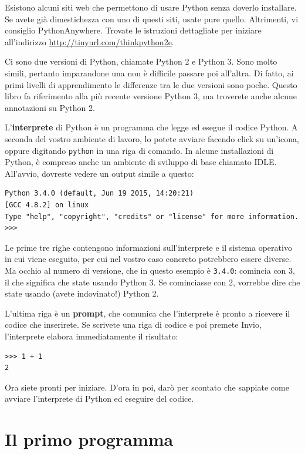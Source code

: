 \documentclass[10pt]{book}
\begin{document}
Esistono alcuni siti web che permettono di usare Python senza doverlo installare. Se avete già dimestichezza con uno di questi siti, usate pure quello. Altrimenti, vi consiglio PythonAnywhere. Trovate le istruzioni dettagliate per iniziare all'indirizzo \url{http://tinyurl.com/thinkpython2e}.

Ci sono due versioni di Python, chiamate Python 2 e Python 3. Sono molto simili, pertanto imparandone una non è difficile passare poi all'altra. Di fatto, ai primi livelli di apprendimento le differenze tra le due versioni sono poche. 
Questo libro fa riferimento alla più recente versione Python 3, ma troverete anche alcune annotazioni su Python 2.

L'{\bf interprete} di Python è un programma che legge ed esegue il codice Python. A seconda del vostro ambiente di lavoro, lo potete avviare facendo click su un'icona, oppure digitando {\tt python} in una riga di comando. In alcune installazioni di Python, è compreso anche un ambiente di sviluppo di base chiamato IDLE.
All'avvio, dovreste vedere un output simile a questo:

\begin{verbatim}
Python 3.4.0 (default, Jun 19 2015, 14:20:21)
[GCC 4.8.2] on linux
Type "help", "copyright", "credits" or "license" for more information.
>>>
\end{verbatim}
%
Le prime tre righe contengono informazioni sull'interprete e il sistema operativo in cui viene eseguito, per cui nel vostro caso concreto potrebbero essere diverse. Ma occhio al numero di versione, che in questo esempio è 
{\tt 3.4.0}: comincia con 3, il che significa che state usando Python 3. Se cominciasse con 2, vorrebbe dire che state usando (avete indovinato!) Python 2.

L'ultima riga è un {\bf prompt}, che comunica che l'interprete è pronto a ricevere il codice che inserirete. Se scrivete una riga di codice e poi premete Invio, l'interprete elabora immediatamente il risultato:

\begin{verbatim}
>>> 1 + 1
2
\end{verbatim}
%
Ora siete pronti per iniziare. D'ora in poi, darò per scontato che sappiate come avviare l'interprete di Python ed eseguire del codice.

\section{Il primo programma}
\label{hello}
\end{document}
